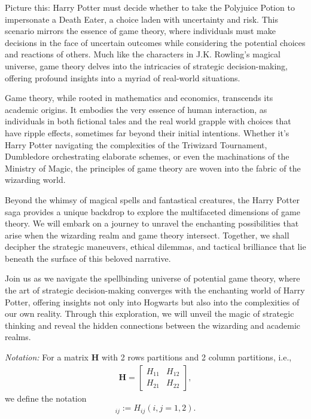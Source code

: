 \documentclass[letterpaper, 10 pt, conference]{ieeeconf}  %
\begin{document}
Picture this: Harry Potter must decide whether to take the Polyjuice Potion to impersonate a Death Eater, a choice laden with uncertainty and risk. This scenario mirrors the essence of game theory, where individuals must make decisions in the face of uncertain outcomes while considering the potential choices and reactions of others. Much like the characters in J.K. Rowling's magical universe, game theory delves into the intricacies of strategic decision-making, offering profound insights into a myriad of real-world situations.

Game theory, while rooted in mathematics and economics, transcends its academic origins. It embodies the very essence of human interaction, as individuals in both fictional tales and the real world grapple with choices that have ripple effects, sometimes far beyond their initial intentions. Whether it's Harry Potter navigating the complexities of the Triwizard Tournament, Dumbledore orchestrating elaborate schemes, or even the machinations of the Ministry of Magic, the principles of game theory are woven into the fabric of the wizarding world.

Beyond the whimsy of magical spells and fantastical creatures, the Harry Potter saga provides a unique backdrop to explore the multifaceted dimensions of game theory. We will embark on a journey to unravel the enchanting possibilities that arise when the wizarding realm and game theory intersect. Together, we shall decipher the strategic maneuvers, ethical dilemmas, and tactical brilliance that lie beneath the surface of this beloved narrative.

Join us as we navigate the spellbinding universe of potential game theory, where the art of strategic decision-making converges with the enchanting world of Harry Potter, offering insights not only into Hogwarts but also into the complexities of our own reality. Through this exploration, we will unveil the magic of strategic thinking and reveal the hidden connections between the wizarding and academic realms.

\emph{Notation:}
For a matrix $\mathbf{H}$ with 2 rows partitions and 2 column partitions, i.e.,
\begin{align*}
    \mathbf{H} = 
    \begin{bmatrix}
        H_{11} & H_{12}\\
        H_{21} & H_{22}
    \end{bmatrix},
\end{align*}
we define the notation
\begin{equation}
    [\mathbf{H}]_{ij} := H_{ij}(i,j = 1,2).
\end{equation}
\end{document}
